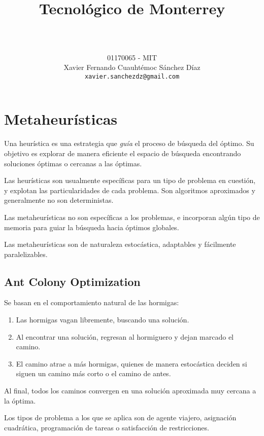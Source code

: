 \documentclass[titlepage, letterpaper]{article}
\title{
\vspace{1in}
\textbf{Tecnológico de Monterrey} \\
\vspace{0.5in}
\textmd{\mahclass} \\
\vspace{0.5in}
\textsc{\mahtitle}
\author{01170065  - MIT \\
Xavier Fernando Cuauhtémoc Sánchez Díaz \\
\texttt{xavier.sanchezdz@gmail.com}}
\date{\mahdate}
}
\begin{document}
\begin{titlepage}
    \maketitle
\end{titlepage}

%
%

\section{Metaheurísticas}

Una heurística es una estrategia que \textit{guía} el proceso de búsqueda del óptimo.
Su objetivo es explorar de manera eficiente el espacio de búsqueda encontrando soluciones óptimas o cercanas a las óptimas.

Las heurísticas son usualmente específicas para un tipo de problema en cuestión, y explotan las particularidades de cada problema.
Son algoritmos aproximados y generalmente no son deterministas.

Las metaheurísticas no son específicas a los problemas,
e incorporan algún tipo de memoria para guiar la búsqueda hacia óptimos globales.

Las metaheurísticas son de naturaleza estocástica, adaptables y fácilmente paralelizables.

\subsection{Ant Colony Optimization} %
\label{sub:ants}

Se basan en el comportamiento natural de las hormigas:
\begin{tcolorbox}
\begin{enumerate}
    \item Las hormigas vagan libremente, buscando una solución.
    \item Al encontrar una solución, regresan al hormiguero y dejan marcado el camino.
    \item El camino atrae a más hormigas, quienes de manera estocástica deciden si siguen un camino más corto o el camino de antes.
\end{enumerate}
Al final, todos los caminos convergen en una solución aproximada muy cercana a la óptima.
\end{tcolorbox}

Los tipos de problema a los que se aplica son de agente viajero, asignación cuadrática, programación de tareas o satisfacción de restricciones.
\end{document}
